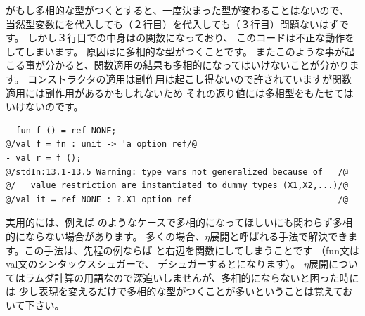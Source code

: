 \documentclass[11pt,a4paper]{article}
\begin{document}
がもし多相的な型がつくとすると、一度決まった型が変わることはないので、
当然型変数にを代入しても（２行目）を代入しても（３行目）問題ないはずです。
しかし３行目での中身はの関数になっており、
このコードは不正な動作をしてしまいます。
原因はに多相的な型がつくことです。
またこのような事が起こる事が分かると、関数適用の結果も多相的になってはいけないことが分かります。
コンストラクタの適用は副作用は起こし得ないので許されていますが関数適用には副作用があるかもしれないため
それの返り値には多相型をもたせてはいけないのです。

\begin{lstlisting}[caption=関数の例,label=code:value-restricted-function]
- fun f () = ref NONE;
@/val f = fn : unit -> 'a option ref/@
- val r = f ();
@/stdIn:13.1-13.5 Warning: type vars not generalized because of   /@
@/   value restriction are instantiated to dummy types (X1,X2,...)/@
@/val it = ref NONE : ?.X1 option ref                             /@
\end{lstlisting}

実用的には、例えば
のようなケースで多相的になってほしいにも関わらず多相的にならない場合があります。
多くの場合、$\eta$展開と呼ばれる手法で解決できます。この手法は、先程の例ならば
と右辺を関数にしてしまうことです
（fun文はval文のシンタックスシュガーで、
デシュガーするとになります）。
$\eta$展開についてはラムダ計算の用語なので深追いしませんが、多相的にならないと困った時には
少し表現を変えるだけで多相的な型がつくことが多いということは覚えておいて下さい。
\end{document}

